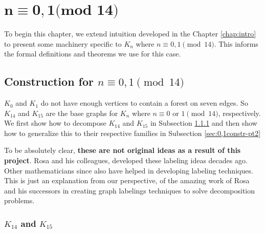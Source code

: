 \chapter{$\mathbf{n\equiv 0,1\textbf{(mod 14)}}$} \label{chap:0,1(mod 14)}

To begin this chapter, we extend intuition developed in the Chapter \ref{chap:intro} to present some machinery specific to $K_{n}$ where $n\equiv 0,1\pmod{14}$. This informs the formal definitions and theorems we use for this case.

\section{Construction for $n\equiv 0,1 \pmod{14}$}\label{sec:0,1constr}
$K_{0}$ and $K_{1}$ do not have enough vertices to contain a forest on seven edges. So $K_{14}$ and $K_{15}$ are the base graphs for $K_{n}$ where $n \equiv 0 \textrm{ or } 1 \pmod{14}$, respectively. We first show how to decompose $K_{14}$ and $K_{15}$ in Subsection \ref{sec:0,1constr-pt1} and then show how to generalize this to their respective families in Subsection \ref{sec:0,1constr-pt2}

To be absolutely clear, \textbf{these are not original ideas as a result of this project}. Rosa and his colleagues, developed these labeling ideas decades ago. Other mathematicians since also have helped in developing labeling techniques. This is just an explanation from our perspective, of the amazing work of Rosa and his successors in creating graph labelings techniques to solve decomposition problems.

\subsection{$K_{14}$ and $K_{15}$}\label{sec:0,1constr-pt1}


